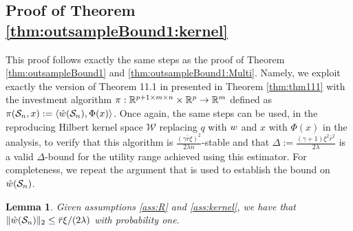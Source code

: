 \documentclass[]{interact}
\theoremstyle{plain}%
\newtheorem{lemma}[theorem]{Lemma}
\theoremstyle{definition}
\theoremstyle{remark}
\newcommand{\0}{\V{0}}
\newcommand{\1}{\V{1}}
\renewcommand{\Re}{\mathbb{R}}
\newcommand{\modified}[1]{{\color{blue} #1}}
\newcommand{\xMax}{\xi}
\theoremstyle{plain}
\theoremstyle{definition}
\begin{document}
\subsection{\modified{Proof of Theorem \ref{thm:outsampleBound1:kernel}}}\label{sec:thm1_proofKernel}

This proof follows exactly the same steps as the proof of Theorem \ref{thm:outsampleBound1} and \ref{thm:outsampleBound1:Multi}. Namely, we exploit exactly the  version of Theorem 11.1 in \cite{mohri2012foundations} presented in Theorem \ref{thm:thm111} with the investment algorithm $\investA:\Re^{p+1\times m \times n} \times \Re^p \rightarrow \Re^m$ defined as ${\pi}(\mathcal{S}_n,x):=\langle{\hat{w}}(\mathcal{S}_n), \Phi(x)\rangle $. Once again, the same steps can be used, in the reproducing Hilbert kernel space $\mathcal{W}$ replacing $q$ with ${w}$ and $x$ with $\Phi(x)$ in the analysis,  to verify that this algorithm is $\frac{(\gamma\bar r\xMax)^2}{2\lambda n}$-stable and that $\Delta:=\frac{(\gamma+1)\xi^2
      \bar{r}^2}{2\lambda}$ is a valid $\Delta$-bound for the utility range achieved using this estimator. For completeness, we repeat the argument that is used to establish the bound on ${\hat{w}}(\mathcal{S}_n)$.

\begin{lemma}\label{thm:qhatBoundKernel}
Given assumptions \ref{ass:R} and \ref{ass:kernel}, we have that $\|{\hat{w}}(\mathcal{S}_n)\|_2 \leq \bar{r}\xi/(2\lambda)$ with probability one.
\end{lemma}
\end{document}
